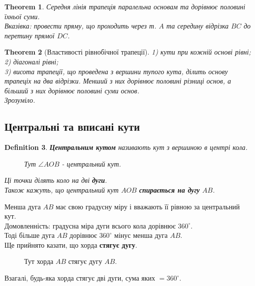 \documentclass[a4paper, 10pt]{article}
\theoremstyle{theoremdd}
\newtheorem{theorem}{Theorem}[subsection]
\theoremstyle{theoremdd}
\theoremstyle{theoremdd}
\newtheorem{definition}[theorem]{Definition}
\theoremstyle{theoremdd}
\theoremstyle{theoremdd}
\theoremstyle{theoremdd}
\theoremstyle{theoremdd}
\theoremstyle{theoremdd}
\theoremstyle{theoremdd}
\begin{document}
\begin{theorem}
Середня лінія трапеція паралельна основам та дорівнює половині їхньої суми.\\
\textit{Вказівка: провести пряму, що проходить через т. $A$ та середину відрізка $BC$ до перетину прямої $DC$.}
\end{theorem}

\begin{theorem}[Властивості рівнобічної трапеції]
1) кути при кожній основі рівні;\\
2) діагоналі рівні;\\
3) висота трапеції, що проведена з вершини тупого кута, ділить основу трапеціх на два відрізки. Менший з них дорівнює половині різниці основ, а більший з них дорівнює половині суми основ.\\
\textit{Зрозуміло.}
\end{theorem}

\subsection{Центральні та вписані кути}
\begin{definition}
\textbf{Центральним кутом} називають кут з вершиною в центрі кола.
\begin{figure}[H]
\centering
{}
\caption*{Тут $\angle AOB$ - центральний кут.}
\end{figure}
Ці точки ділять коло на дві \textbf{дуги}.\\
Також кажуть, що центральний кут $AOB$ \textbf{спирається на дугу} $AB$.
\end{definition}
Менша дуга $AB$ має свою градусну міру і вважають її рівною за центральний кут.\\
Домовленність: градусна міра дуги всього кола дорівнює $360^\circ$.\\
Тоді більше дуга $AB$ дорівнює $360^\circ$ мінус менша дуга $AB$.
\bigskip \\
Ще прийнято казати, що хорда \textbf{стягує дугу}.
\begin{figure}[H]
\centering
{}
\caption*{Тут хорда $AB$ стягує дугу $AB$.}
\end{figure}
Взагалі, будь-яка хорда стягує дві дуги, сума яких $=360^\circ$.
\end{document}
